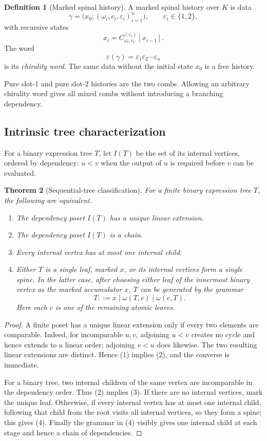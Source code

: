 \documentclass[11pt]{article}
\newtheorem{theorem}{Theorem}[section]
\theoremstyle{definition}
\newtheorem{definition}[theorem]{Definition}
\theoremstyle{remark}
\begin{document}
\begin{definition}[Marked spinal history]
A marked spinal history over \(K\) is data
\[
\gamma=
\bigl(x_0;(\omega_i,c_i,\varepsilon_i)_{i=1}^{n}\bigr),
\qquad
\varepsilon_i\in\{1,2\},
\]
with recursive states
\[
x_i=C^{(\varepsilon_i)}_{\omega_i,c_i}[x_{i-1}].
\]
The word
\[
\varepsilon(\gamma)=\varepsilon_1\varepsilon_2\cdots\varepsilon_n
\]
is its \emph{chirality word}.  The same data without the initial state
\(x_0\) is a free history.
\end{definition}

Pure slot-\(1\) and pure slot-\(2\) histories are the two combs.  Allowing an
arbitrary chirality word gives all mixed combs without introducing a branching
dependency.

\subsection{Intrinsic tree characterization}

For a binary expression tree \(T\), let \(I(T)\) be the set of its internal
vertices, ordered by dependency: \(u<v\) when the output of \(u\) is required
before \(v\) can be evaluated.

\begin{theorem}[Sequential-tree classification]
\label{thm:sequential-tree}
For a finite binary expression tree \(T\), the following are equivalent.
\begin{enumerate}
  \item The dependency poset \(I(T)\) has a unique linear extension.
  \item The dependency poset \(I(T)\) is a chain.
  \item Every internal vertex has at most one internal child.
  \item Either \(T\) is a single leaf, marked \(x\), or its internal vertices
  form a single spine.  In the latter case, after choosing either leaf of the
  innermost binary vertex as the marked accumulator \(x\), \(T\) can be
  generated by the grammar
  \[
  T::=x\mid\omega(T,c)\mid\omega(c,T).
  \]
  Here each \(c\) is one of the remaining atomic leaves.
\end{enumerate}
\end{theorem}

\begin{proof}
A finite poset has a unique linear extension only if every two elements are
comparable.  Indeed, for incomparable \(u,v\), adjoining \(u<v\) creates no
cycle and hence extends to a linear order; adjoining \(v<u\) does likewise.
The two resulting linear extensions are distinct.  Hence (1) implies (2),
and the converse is immediate.

For a binary tree, two internal children of the same vertex are incomparable
in the dependency order.  Thus (2) implies (3).  If there are no internal
vertices, mark the unique leaf.  Otherwise, if every internal vertex has at
most one internal child, following that child from the root visits all
internal vertices, so they form a spine; this gives (4).  Finally the grammar
in (4) visibly gives one internal child at each stage and hence a chain of
dependencies.
\end{proof}
\end{document}
